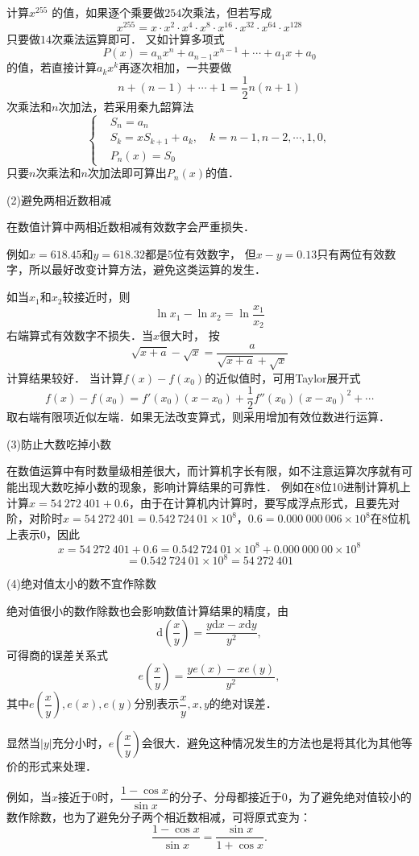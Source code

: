 计算$x^{255}$ 的值，如果逐个乘要做$254$次乘法，但若写成
$$x^{255}=x\cdot x^2\cdot x^4\cdot x^8\cdot x^{16}\cdot x^{32}\cdot x^{64}\cdot x^{128}$$
只要做$14$次乘法运算即可． 又如计算多项式
$$P(x)=a_nx^n+a_{n-1}x^{n-1}+\cdots+a_1x+a_0$$
的值，若直接计算$a_kx^k$再逐次相加，一共要做
$$n+(n-1)+\cdots+1=\frac{1}{2}n(n+1)$$
次乘法和$n$次加法，若采用秦九韶算法
$$\left\{
\begin{aligned}
    &S_n=a_n\\
    &S_k=xS_{k+1}+a_k,\quad k=n-1,n-2,\cdots,1,0,\\
    &P_n(x)=S_0
\end{aligned}
\right.$$
只要$n$次乘法和$n$次加法即可算出$P_n(x)$的值．

(2)避免两相近数相减

在数值计算中两相近数相减有效数字会严重损失．

例如$x=618.45$和$y=618.32$都是5位有效数字，
但$x-y=0.13$只有两位有效数字，所以最好改变计算方法，避免这类运算的发生．

如当$x_1$和$x_2$较接近时，则$$\ln x_1-\ln
x_2=\ln\frac{x_1}{x_2}$$右端算式有效数字不损失．当$x$很大时，
按$$\sqrt{x+a}-\sqrt{x}=\frac{a}{\sqrt{x+a}+\sqrt{x}}$$计算结果较好．
当计算$f(x)-f(x_0)$的近似值时，可用Taylor展开式
$$f(x)-f(x_0)=f'(x_0)(x-x_0)+\frac{1}{2}f''(x_0)(x-x_0)^2+\cdots$$
取右端有限项近似左端．如果无法改变算式，则采用增加有效位数进行运算．

(3)防止大数吃掉小数

在数值运算中有时数量级相差很大，而计算机字长有限，如不注意运算次序就有可能出现大数吃掉小数的现象，影响计算结果的可靠性．
例如在8位10进制计算机上计算$x=54\ 272\ 401+0.6$，由于在计算机内计算时，要写成浮点形式，且要先对阶，对阶时$x=54\ 272\ 401=0.542\ 724\ 01\times
10^8$，$0.6=0.000\ 000\ 006\times10^8$在8位机上表示0，因此
$$x=54\ 272\ 401+0.6=0.542\ 724\ 01\times10^8+0.000\ 000\ 00\times10^8$$
$$=0.542\ 724\ 01\times10^8=54\ 272\ 401$$

(4)绝对值太小的数不宜作除数

绝对值很小的数作除数也会影响数值计算结果的精度，由
$$\mathrm{d}\left(\frac{x}{y}\right)=\frac{y\mathrm{d}x-x\mathrm{d}y}{y^2},$$
可得商的误差关系式
$$e\left(\frac{x}{y}\right)=\frac{ye(x)-xe(y)}{y^2},$$
其中$e\left(\dfrac{x}{y}\right),e(x),e(y)$分别表示$\dfrac{x}{y},x,y$的绝对误差．

显然当$|y|$充分小时，$e\left(\dfrac{x}{y}\right)$会很大．避免这种情况发生的方法也是将其化为其他等价的形式来处理．

例如，当$x$接近于0时，$\dfrac{1-\cos x}{\sin
x}$的分子、分母都接近于0，为了避免绝对值较小的数作除数，也为了避免分子两个相近数相减，可将原式变为：
$$\frac{1-\cos x}{\sin x}=\frac{\sin x}{1+\cos x}.$$

